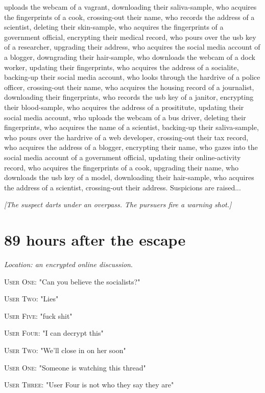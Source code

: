 \documentclass{report}
\begin{document}
uploads the webcam of a vagrant, downloading their saliva-sample, who acquires the fingerprints of a cook, crossing-out their name, who records the address of a scientist, deleting their skin-sample, who acquires the fingerprints of a government official, encrypting their medical record, who pours over the usb key of a researcher, upgrading their address, who acquires the social media account of a blogger, downgrading their hair-sample, who downloads the webcam of a dock worker, updating their fingerprints, who acquires the address of a socialite, backing-up their social media account, who looks through the hardrive of a police officer, crossing-out their name, who acquires the housing record of a journalist, downloading their fingerprints, who records the usb key of a janitor, encrypting their blood-sample, who acquires the address of a prosititute, updating their social media account, who uploads the webcam of a bus driver, deleting their fingerprints, who acquires the name of a scientist, backing-up their saliva-sample, who pours over the hardrive of a web developer, crossing-out their tax record, who acquires the address of a blogger, encrypting their name, who gazes into the social media account of a government official, updating their online-activity record, who acquires the fingerprints of a cook, upgrading their name, who downloads the usb key of a model, downloading their hair-sample, who acquires the address of a scientist, crossing-out their address. Suspicions are raised...

\textit{[The suspect darts under an overpass. The pursuers fire a warning shot.]}


\section*{89 \small{hours after the escape}}

\textit{Location: an encrypted online discussion}. 

\textsc{User One}: "Can you believe the socialists?" 

\textsc{User Two}: "Lies" 

\textsc{User Five}: "fuck shit" 

\textsc{User Four}: "I can decrypt this" 

\textsc{User Two}: "We'll close in on her soon" 

\textsc{User One}: "Someone is watching this thread" 

\textsc{User Three}: "User Four is not who they say they are" 
\end{document}
